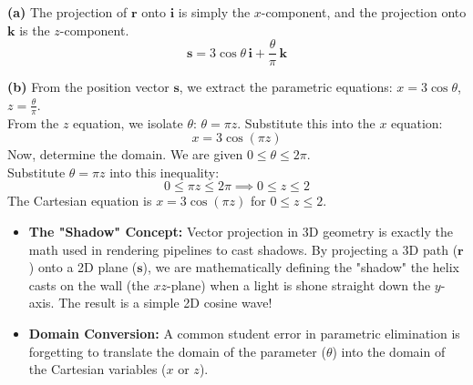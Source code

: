 \begin{solution}
\textbf{(a)} The projection of $\mathbf{r}$ onto $\mathbf{i}$ is simply the $x$-component, and the projection onto $\mathbf{k}$ is the $z$-component. 
$$ \mathbf{s} = 3\cos\theta \, \mathbf{i} + \frac{\theta}{\pi} \, \mathbf{k} $$
\vspace{-2mm}

\textbf{(b)} From the position vector $\mathbf{s}$, we extract the parametric equations:
$x = 3\cos\theta$, $z = \frac{\theta}{\pi}$. \\
From the $z$ equation, we isolate $\theta$:
$\theta = \pi z$. Substitute this into the $x$ equation:
$$ x = 3\cos(\pi z) $$
Now, determine the domain. We are given $0 \le \theta \le 2\pi$. \\
Substitute $\theta = \pi z$ into this inequality:
$$ 0 \le \pi z \le 2\pi \implies 0 \le z \le 2 $$
The Cartesian equation is $x = 3\cos(\pi z)$ for $0 \le z \le 2$.
\end{solution}

\begin{takeaways}
\begin{itemize}[leftmargin=*]
    \item \textbf{The "Shadow" Concept:} Vector projection in 3D geometry is exactly the math used in rendering pipelines to cast shadows. By projecting a 3D path ($\mathbf{r}$) onto a 2D plane ($\mathbf{s}$), we are mathematically defining the "shadow" the helix casts on the wall (the $xz$-plane) when a light is shone straight down the $y$-axis. The result is a simple 2D cosine wave! 
    \item \textbf{Domain Conversion:} A common student error in parametric elimination is forgetting to translate the domain of the parameter ($\theta$) into the domain of the Cartesian variables ($x$ or $z$).
\end{itemize}
\end{takeaways}

\vspace{1em}

